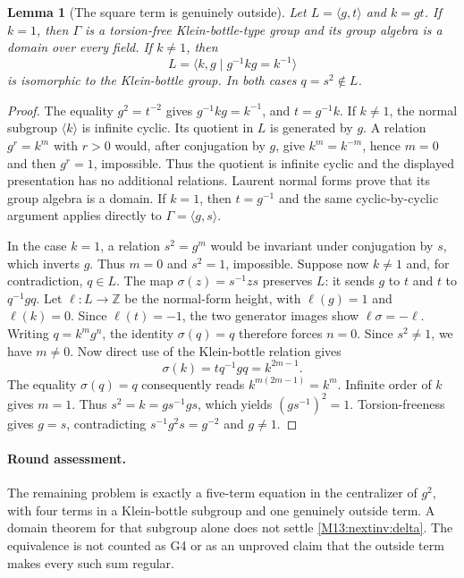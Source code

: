 \documentclass[11pt,a4paper,oneside]{report}
\newtheorem{lemma}[theorem]{Lemma}
\theoremstyle{definition}
\theoremstyle{remark}
\newcommand{\Z}{\mathbb Z}
\begin{document}
\begin{lemma}[The square term is genuinely outside]
\label{M13:nextinv:outside}
Let $L=\langle g,t\rangle$ and $k=gt$.
If $k=1$, then $\Gamma$ is a torsion-free Klein-bottle-type group
and its group algebra is a domain over every field.
If $k\ne1$, then
\[
 L=\langle k,g\mid g^{-1}kg=k^{-1}\rangle
\]
is isomorphic to the Klein-bottle group. In both cases $q=s^2\notin L$.
\end{lemma}
\begin{proof}
The equality $g^2=t^{-2}$ gives $g^{-1}kg=k^{-1}$, and
$t=g^{-1}k$. If $k\ne1$, the normal subgroup $\langle k\rangle$
is infinite cyclic. Its quotient in $L$ is generated by $g$.
A relation $g^r=k^m$ with $r>0$ would, after conjugation by $g$,
give $k^m=k^{-m}$, hence $m=0$ and then $g^r=1$, impossible.
Thus the quotient is infinite cyclic and the displayed presentation
has no additional relations. Laurent normal forms prove that its
group algebra is a domain. If $k=1$, then $t=g^{-1}$ and the same
cyclic-by-cyclic argument applies directly to $\Gamma=\langle g,s\rangle$.

In the case $k=1$, a relation $s^2=g^m$ would be invariant under
conjugation by $s$, which inverts $g$. Thus $m=0$ and $s^2=1$,
impossible. Suppose now $k\ne1$ and, for contradiction, $q\in L$.
The map $\sigma(z)=s^{-1}zs$ preserves $L$: it sends $g$ to $t$
and $t$ to $q^{-1}gq$. Let $\ell:L\to\Z$ be the normal-form
height, with $\ell(g)=1$ and $\ell(k)=0$. Since $\ell(t)=-1$,
the two generator images show $\ell\sigma=-\ell$.
Writing $q=k^m g^n$, the identity $\sigma(q)=q$ therefore forces
$n=0$. Since $s^2\ne1$, we have $m\ne0$.
Now direct use of the Klein-bottle relation gives
\[
 \sigma(k)=tq^{-1}gq=k^{2m-1}.
\]
The equality $\sigma(q)=q$ consequently reads
$k^{m(2m-1)}=k^m$. Infinite order of $k$ gives $m=1$.
Thus $s^2=k=gs^{-1}gs$, which yields
$(gs^{-1})^2=1$. Torsion-freeness gives $g=s$, contradicting
$s^{-1}g^2s=g^{-2}$ and $g\ne1$.
\end{proof}

\paragraph{Round assessment.}
The remaining problem is exactly a five-term equation in the centralizer
of $g^2$, with four terms in a Klein-bottle subgroup and one genuinely
outside term. A domain theorem for that subgroup alone does not settle
\eqref{M13:nextinv:delta}. The equivalence is not counted as G4 or as an
unproved claim that the outside term makes every such sum regular.
\end{document}
